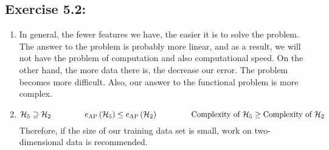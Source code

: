 \documentclass[]{book}
\begin{document}
\subsection*{Exercise 5.2:}
\begin{enumerate}
    \item In general, the fewer features we have, the easier it is to solve the problem. The answer to the problem is probably more linear, and as a result, we will not have the problem of computation and also computational speed. On the other hand, the more data there is, the decrease our error. The problem becomes more difficult. Also, our answer to the functional problem is more complex.
    \item 
    \begin{equation*}
        \mathcal{H}_5\supseteq  \mathcal{H}_2 \hspace{1.5cm} e_{\text{AP}}\left ( \mathcal{H}_5 \right )\leq e_{\text{AP}}\left ( \mathcal{H}_2 \right )\hspace{1.5cm} \text{Complexity of }\mathcal{H}_5 \geq  \text{Complexity of }\mathcal{H}_2
    \end{equation*}
    Therefore, if the size of our training data set is small, work on two-dimensional data is recommended.
\end{enumerate}
\end{document}
